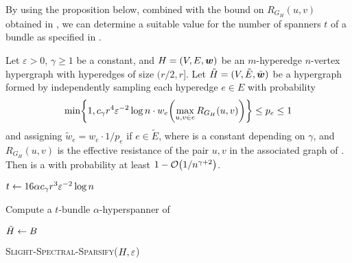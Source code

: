 By using the proposition below, combined with the bound on \( R_{G_H}(u, v) \) obtained in , we can determine a suitable value for the number of spanners \( t \) of a bundle as specified in .



\begin{proposition} \label{prop:constant_probability}

Let \( \varepsilon > 0 \), \( \gamma \geq 1 \) be a constant, and \( { H} = (V, E, \boldsymbol{w}) \) be an \( m \)-hyperedge \( n \)-vertex hypergraph with hyperedges of size \( (r/2, r] \).
Let \( { \tilde H} = (V, \tilde{E}, \tilde{\boldsymbol{w}} ) \) be a hypergraph formed by independently sampling each hyperedge \( e \in E \) with probability
\begin{equation*}
\min \left\{ 1, \ConstantProp r^4 \varepsilon ^{-2} \log n \cdot w_e \left( \max_{u, v \in e} R_{G_H}(u, v) \right) \right\} \leq p_e \leq 1
\end{equation*}
and assigning \( \tilde{w}_e = w_e \cdot 1/p_e  \) if \( e \in \tilde{E} \), where \ConstantProp is a constant depending on \( \gamma \), and \( R_{G_H}(u, v) \) is the effective resistance of the pair \( u, v \) in the associated graph  of .
Then  is a \SpectralHypersparsifier{} with probability at least \( 1 - \atmost{1/n^{\gamma + 2}} \).
\end{proposition}



\begin{algorithm}


\( t \gets 16 \alpha c_{ \gamma } r^3 \varepsilon ^{-2} \log n \)

Compute a \( t \)-bundle \( \alpha \)-hyperspanner  of 

\( { \tilde H} \gets {\ensuremath{ B}} \)



\caption{\textsc{Slight-Spectral-Sparsify(\( { H}, \varepsilon \))}}
\label{alg:light_spectral_sparsify}
\end{algorithm}


